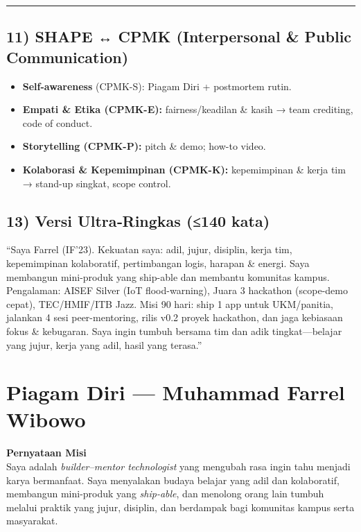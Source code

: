 \documentclass[
  letterpaper,
  DIV=11,
  numbers=noendperiod]{scrreprt}
\begin{document}
\begin{center}\rule{0.5\linewidth}{0.5pt}\end{center}

\section{11) SHAPE ↔ CPMK (Interpersonal \& Public
Communication)}\label{shape-cpmk-interpersonal-public-communication}

\begin{itemize}
\item
  \textbf{Self-awareness} (CPMK-S): Piagam Diri + postmortem rutin.
\item
  \textbf{Empati \& Etika (CPMK-E):} fairness/keadilan \& kasih → team
  crediting, code of conduct.
\item
  \textbf{Storytelling (CPMK-P):} pitch \& demo; how-to video.
\item
  \textbf{Kolaborasi \& Kepemimpinan (CPMK-K):} kepemimpinan \& kerja
  tim → stand-up singkat, scope control.
\end{itemize}

\section{13) Versi Ultra‑Ringkas (≤140
kata)}\label{versi-ultraringkas-140-kata}

``Saya Farrel (IF'23). Kekuatan saya: adil, jujur, disiplin, kerja tim,
kepemimpinan kolaboratif, pertimbangan logis, harapan \& energi. Saya
membangun mini-produk yang ship-able dan membantu komunitas kampus.
Pengalaman: AISEF Silver (IoT flood-warning), Juara 3 hackathon
(scope-demo cepat), TEC/HMIF/ITB Jazz. Misi 90 hari: ship 1 app untuk
UKM/panitia, jalankan 4 sesi peer-mentoring, rilis v0.2 proyek
hackathon, dan jaga kebiasaan fokus \& kebugaran. Saya ingin tumbuh
bersama tim dan adik tingkat---belajar yang jujur, kerja yang adil,
hasil yang terasa.''


\chapter{Piagam Diri --- Muhammad Farrel
Wibowo}\label{piagam-diri-muhammad-farrel-wibowo}

\textbf{Pernyataan Misi}\\
Saya adalah \emph{builder--mentor technologist} yang mengubah rasa ingin
tahu menjadi karya bermanfaat. Saya menyalakan budaya belajar yang adil
dan kolaboratif, membangun mini-produk yang \emph{ship-able}, dan
menolong orang lain tumbuh melalui praktik yang jujur, disiplin, dan
berdampak bagi komunitas kampus serta masyarakat.
\end{document}
